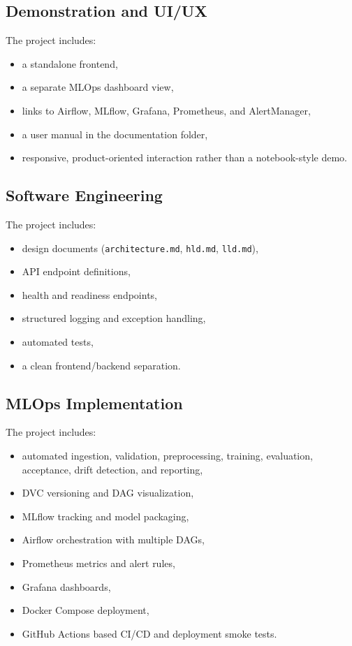 \documentclass[11pt,a4paper]{article}
\begin{document}
\subsection{Demonstration and UI/UX}

The project includes:

\begin{itemize}[leftmargin=1.4em]
  \item a standalone frontend,
  \item a separate MLOps dashboard view,
  \item links to Airflow, MLflow, Grafana, Prometheus, and AlertManager,
  \item a user manual in the documentation folder,
  \item responsive, product-oriented interaction rather than a notebook-style demo.
\end{itemize}

\subsection{Software Engineering}

The project includes:

\begin{itemize}[leftmargin=1.4em]
  \item design documents (\texttt{architecture.md}, \texttt{hld.md}, \texttt{lld.md}),
  \item API endpoint definitions,
  \item health and readiness endpoints,
  \item structured logging and exception handling,
  \item automated tests,
  \item a clean frontend/backend separation.
\end{itemize}

\subsection{MLOps Implementation}

The project includes:

\begin{itemize}[leftmargin=1.4em]
  \item automated ingestion, validation, preprocessing, training, evaluation, acceptance, drift detection, and reporting,
  \item DVC versioning and DAG visualization,
  \item MLflow tracking and model packaging,
  \item Airflow orchestration with multiple DAGs,
  \item Prometheus metrics and alert rules,
  \item Grafana dashboards,
  \item Docker Compose deployment,
  \item GitHub Actions based CI/CD and deployment smoke tests.
\end{itemize}
\end{document}
